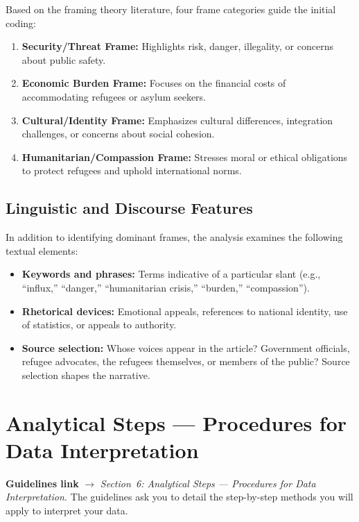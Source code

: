\documentclass[11pt,a4paper]{article}
\begin{document}
Based on the framing theory literature, four frame categories guide the initial coding:

\begin{enumerate}[nosep]
  \item \textbf{Security/Threat Frame:} Highlights risk, danger, illegality, or concerns about public safety.
  \item \textbf{Economic Burden Frame:} Focuses on the financial costs of accommodating refugees or asylum seekers.
  \item \textbf{Cultural/Identity Frame:} Emphasizes cultural differences, integration challenges, or concerns about social cohesion.
  \item \textbf{Humanitarian/Compassion Frame:} Stresses moral or ethical obligations to protect refugees and uphold international norms.
\end{enumerate}

\subsection{Linguistic and Discourse Features}

In addition to identifying dominant frames, the analysis examines the following textual elements:

\begin{itemize}[nosep]
  \item \textbf{Keywords and phrases:} Terms indicative of a particular slant (e.g., ``influx,'' ``danger,'' ``humanitarian crisis,'' ``burden,'' ``compassion'').
  \item \textbf{Rhetorical devices:} Emotional appeals, references to national identity, use of statistics, or appeals to authority.
  \item \textbf{Source selection:} Whose voices appear in the article? Government officials, refugee advocates, the refugees themselves, or members of the public? Source selection shapes the narrative.
\end{itemize}


\section{Analytical Steps --- Procedures for Data Interpretation}

\begin{crossrefbox}
\textbf{Guidelines link} $\rightarrow$ \textit{Section~6: Analytical Steps --- Procedures for Data Interpretation.} The guidelines ask you to detail the step-by-step methods you will apply to interpret your data.
\end{crossrefbox}
\end{document}
